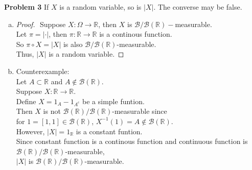 \documentclass{article}
\newcommand{\llb}{\mathcal{B}}
\newcommand{\bbr}{\mathbb{R}}
\begin{document}
\noindent \textbf{Problem 3} If $X$ is a random variable, so is $|X|$. The converse may be false.
\begin{enumerate}[(a)]
	\item
		\begin{proof}
			$ $\newline
			Suppose $X: \Omega\to \bbr$, then $X$ is $\llb/\llb(\bbr)-$measurable. \\
			Let $\pi = |\cdot|$, then $\pi: \bbr \to \bbr$ is a continous function.\\
			So $\pi\circ X = |X|$ is also $\llb/\llb(\bbr)$-measurable. \\
			Thus, $|X|$ is a random variable. 
		\end{proof}
	\item Counterexample:\\
		Let $A \subset \bbr$ and $A \not\in \llb(\bbr)$.\\
		Suppose $X:\bbr \to \bbr$.\\
		Define $X = 1_A - 1_{A^c}$ be a simple funtion.\\
		Then $X$ is not $\llb(\bbr)/\llb(\bbr)$-measurable since \\
		for $1 = [1,1] \in \llb(\bbr)$, $X^{-1}(1) = A \not\in \llb(\bbr)$.\\
		However, $|X| = 1_{\bbr}$ is a constant funtion. \\
		Since constant function is a continous function and continuous function is $\llb(\bbr)/\llb(\bbr)$-measurable,\\
		$|X|$ is $\llb(\bbr)/\llb(\bbr)$-measurable.


\end{enumerate}
\end{document}
